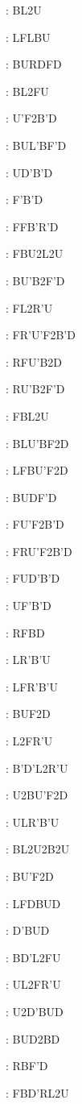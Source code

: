 \documentclass[9pt]{article}
\begin{document}
{\begin{multicols}{6}
: BL2U

: LFLBU

: BURDFD

: BL2FU

: U'F2B'D

: BUL'BF'D

: UD'B'D

: F'B'D

: FFB'R'D

: FBU2L2U

: BU'B2F'D

: FL2R'U

: FR'U'F2B'D

: RFU'B2D

: RU'B2F'D

: FBL2U

: BLU'BF2D

: LFBU'F2D

: BUDF'D

: FU'F2B'D

: FRU'F2B'D

: FUD'B'D

: UF'B'D

: RFBD

: LR'B'U

: LFR'B'U

: BUF2D

: L2FR'U

: B'D'L2R'U

: U2BU'F2D

: ULR'B'U

: BL2U2B2U

: BU'F2D

: LFDBUD

: D'BUD

: BD'L2FU

: UL2FR'U

: U2D'BUD

: BUD2BD

: RBF'D

: FBD'RL2U


\end{multicols}}
\end{document}
